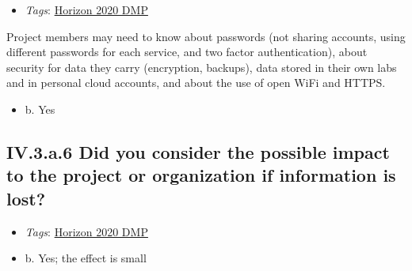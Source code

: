 \documentclass[a4paper,12pt]{report}
\begin{document}
\label{10a10ffd-bfe1-4c6b-bbb6-3dfb1e63a5d5.614ab69d-55a6-4214-b384-00ba21ce92a1.b2f76c0a-847a-403c-9ed6-09cad10e625e.dc327e53-cf4f-44e7-8e66-40ddf1b4ae0a}


\begin{itemize}
  \item \textit{Tags}: \ul{Horizon 2020 DMP}
  \end{itemize}


\noindent
\begin{markdown}
Project members may need to know about passwords (not sharing accounts, using different passwords for each service, and two factor authentication), about security for data they carry (encryption, backups), data stored in their own labs and in personal cloud accounts, and about the use of open WiFi and HTTPS.
\end{markdown}



\begin{itemize}
  \item[\CheckmarkBold] b. Yes
\end{itemize}




\subsection*{\protect\textcolor{colorSecId}{IV.3.a.6} Did you consider the possible impact to the project or organization if information is lost?}

\label{10a10ffd-bfe1-4c6b-bbb6-3dfb1e63a5d5.614ab69d-55a6-4214-b384-00ba21ce92a1.b2f76c0a-847a-403c-9ed6-09cad10e625e.67c34ee1-2e71-423c-97a7-fe6aa3723465}


\begin{itemize}
  \item \textit{Tags}: \ul{Horizon 2020 DMP}
  \end{itemize}




\begin{itemize}
  \item[\CheckmarkBold] b. Yes; the effect is small
\end{itemize}
\end{document}
